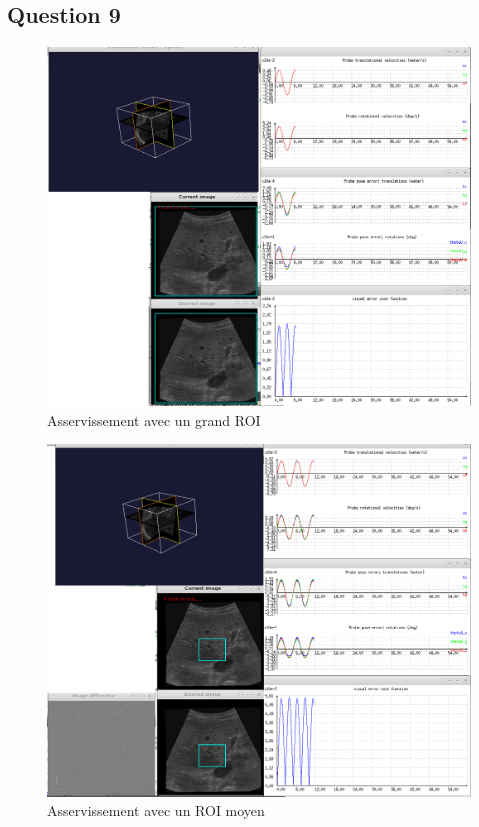 \documentclass[a4paper,11pt]{article}
\begin{document}
\subsection{Question 9}
\begin{figure}[!h]
    \centering
    \includegraphics[width=1.0\textwidth]{./images/q9_large.png}
    \caption{Asservissement avec un grand ROI}
    \label{largeRoi}
\end{figure}

\begin{figure}[!h]
    \centering
    \includegraphics[width=1.0\textwidth]{./images/q9_medium.png}
    \caption{Asservissement avec un ROI moyen}
    \label{mediumRoi}
\end{figure}
\end{document}
